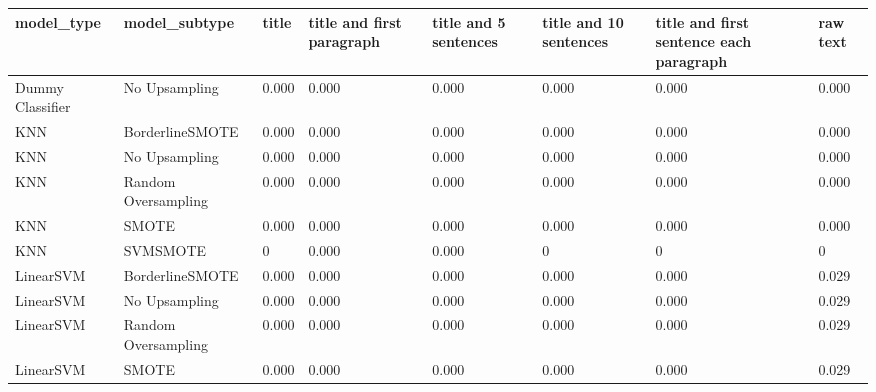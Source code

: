 \begin{tabular}{llllllll}
\toprule
                  model\_type &       model\_subtype & title & title and first paragraph & title and 5 sentences & title and 10 sentences & title and first sentence each paragraph &  raw text \\
\midrule
            Dummy Classifier &       No Upsampling & 0.000 &                     0.000 &                 0.000 &                  0.000 &                                   0.000 &     0.000 \\
                         KNN &     BorderlineSMOTE & 0.000 &                     0.000 &                 0.000 &                  0.000 &                                   0.000 &     0.000 \\
                         KNN &       No Upsampling & 0.000 &                     0.000 &                 0.000 &                  0.000 &                                   0.000 &     0.000 \\
                         KNN & Random Oversampling & 0.000 &                     0.000 &                 0.000 &                  0.000 &                                   0.000 &     0.000 \\
                         KNN &               SMOTE & 0.000 &                     0.000 &                 0.000 &                  0.000 &                                   0.000 &     0.000 \\
                         KNN &            SVMSMOTE &     0 &                     0.000 &                 0.000 &                      0 &                                       0 &         0 \\
                   LinearSVM &     BorderlineSMOTE & 0.000 &                     0.000 &                 0.000 &                  0.000 &                                   0.000 &     0.029 \\
                   LinearSVM &       No Upsampling & 0.000 &                     0.000 &                 0.000 &                  0.000 &                                   0.000 &     0.029 \\
                   LinearSVM & Random Oversampling & 0.000 &                     0.000 &                 0.000 &                  0.000 &                                   0.000 &     0.029 \\
                   LinearSVM &               SMOTE & 0.000 &                     0.000 &                 0.000 &                  0.000 &                                   0.000 &     0.029 \\

\end{tabular}
